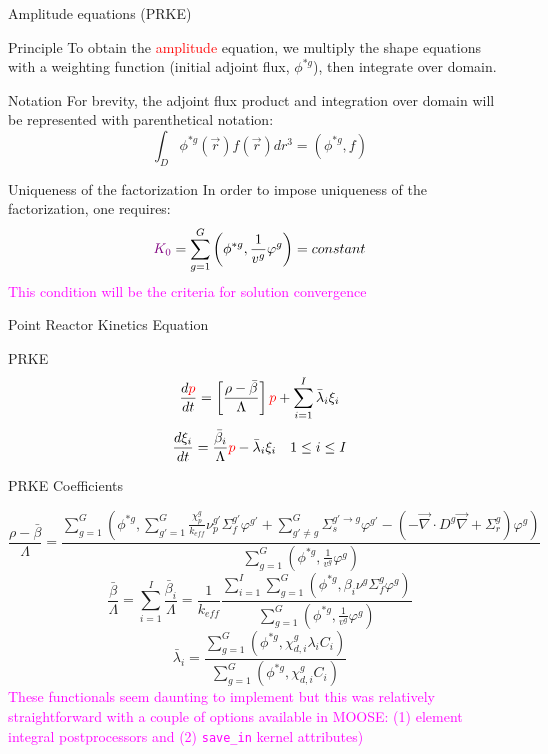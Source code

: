 \documentclass[8pt]{beamer}
\renewcommand{\div}{\vec{\nabla}\! \cdot \!}
\newcommand{\grad}{\vec{\nabla}}
\newcommand{\be}{\begin{equation*}}
\newcommand{\ee}{\end{equation*}}
\newcommand{\keff}{\ensuremath{k_{\textit{eff}}}}
\newcommand{\tcr}[1]{\textcolor{red}{#1}}
\newcommand{\tcm}[1]{\textcolor{magenta}{#1}}
\newcommand{\tcp}[1]{\textcolor{violet}{#1}}
\begin{document}
\begin{frame}{Amplitude equations (PRKE)}

\begin{block}{Principle}
To obtain the \tcr{amplitude} equation, we multiply the shape equations with a weighting 
function (initial adjoint flux, $\phi^{*g}$), then integrate over domain.  
\end{block}

\begin{block}{Notation}
For brevity, the adjoint flux product and integration over domain will be represented with parenthetical notation:
\[
\int_D\phi^{*g}(\vec{r})f(\vec{r})dr^3=\left(\phi^{*g},f\right)
\]
\end{block}


\begin{block}{Uniqueness of the factorization}
In order to impose uniqueness of the factorization, one requires:
\[
\tcp{K_0} = \sum_{g=1}^G\left(\phi^{*g},\frac{1}{v^g}\varphi^g\right)= constant
\]
\tcm{This condition will be the criteria for solution convergence}
\end{block}


\end{frame}

\begin{frame}{Point Reactor Kinetics Equation}
\vspace{-2mm}
\begin{block}{PRKE}
\[
\frac{d\tcr{p}}{dt}=\left[\frac{\rho-\bar{\beta}}{\Lambda}\right]\tcr{p}+\sum_{i=1}^I\bar{\lambda}_i\xi_i
\]
\[
\frac{d\xi_i}{dt}=\frac{\bar{\beta}_i}{\Lambda}\tcr{p} - \bar{\lambda}_i\xi_i \quad 1 \le i \le I 
\]
\end{block}
\vspace{-3mm}
\begin{block}{PRKE Coefficients}

\small \be
\frac{\rho-\bar{\beta}}{\Lambda}=
\frac{ \sum_{g=1}^G \left(\phi^{*g},\sum_{g'=1}^G\frac{\chi_p^g}{\keff} \nu_p^{g'} \Sigma_f^{g'}\varphi^{g'} + \sum_{g'\neq g}^G\Sigma_s^{g'\to g} \varphi^{g'} -\left( -\div D^g \grad  + \Sigma_r^g \right)\varphi^g\right)}
{\sum_{g=1}^G \left(\phi^{*g},\frac{1}{v^g}\varphi^g\right)}
\ee \normalsize
\be
\frac{\bar{\beta}}{\Lambda}=\sum_{i=1}^I\frac{\bar{\beta}_i}{\Lambda}=\frac{1}{\keff}
\frac{\sum_{i=1}^I\sum_{g=1}^G(\phi^{*g}, \beta_i\nu^{g} \Sigma_f^g \varphi^{g})}
{\sum_{g=1}^G \left(\phi^{*g},\frac{1}{v^g}\varphi^g\right)}
\ee
\be
\bar{\lambda}_i=\frac{\sum_{g=1}^G(\phi^{*g},\chi_{d,i}^g\lambda_i C_i)}{\sum_{g=1}^G(\phi^{*g},\chi_{d,i}^gC_i)}
\ee
\tcm{These functionals seem daunting to implement but this was relatively straightforward with a couple of options available in MOOSE: (1) element integral postprocessors and (2) {\tt save\_in} kernel attributes)}
\end{block}

\end{frame}
\end{document}
